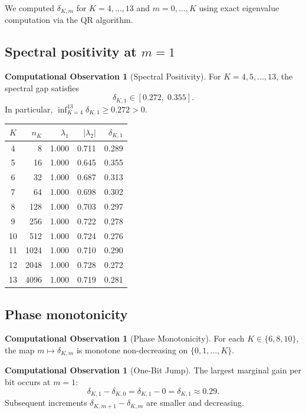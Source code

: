 \documentclass[12pt]{article}
\theoremstyle{definition}
\newtheorem{observation}[theorem]{Computational Observation}
\begin{document}
We computed $\delta_{K,m}$ for $K = 4, \ldots, 13$ and $m = 0, \ldots, K$ using exact eigenvalue computation via the QR algorithm.

\subsection{Spectral positivity at $m=1$}

\begin{observation}[Spectral Positivity]
\label{obs:positivity}
For $K = 4, 5, \ldots, 13$, the spectral gap satisfies
\[
  \delta_{K,1} \in [0.272,\; 0.355].
\]
In particular, $\inf_{K=4}^{13} \delta_{K,1} \geq 0.272 > 0$.
\end{observation}

\begin{center}
\begin{tabular}{@{}crrrr@{}}
\toprule
$K$ & $n_K$ & $\lambda_1$ & $|\lambda_2|$ & $\delta_{K,1}$ \\
\midrule
 4 &    8 & 1.000 & 0.711 & 0.289 \\
 5 &   16 & 1.000 & 0.645 & 0.355 \\
 6 &   32 & 1.000 & 0.687 & 0.313 \\
 7 &   64 & 1.000 & 0.698 & 0.302 \\
 8 &  128 & 1.000 & 0.703 & 0.297 \\
 9 &  256 & 1.000 & 0.722 & 0.278 \\
10 &  512 & 1.000 & 0.724 & 0.276 \\
11 & 1024 & 1.000 & 0.710 & 0.290 \\
12 & 2048 & 1.000 & 0.728 & 0.272 \\
13 & 4096 & 1.000 & 0.719 & 0.281 \\
\bottomrule
\end{tabular}
\end{center}

\subsection{Phase monotonicity}

\begin{observation}[Phase Monotonicity]
\label{obs:mono}
For each $K \in \{6, 8, 10\}$, the map $m \mapsto \delta_{K,m}$ is monotone non-decreasing on $\{0, 1, \ldots, K\}$.
\end{observation}

\begin{observation}[One-Bit Jump]
\label{obs:jump}
The largest marginal gain per bit occurs at $m = 1$:
\[
  \delta_{K,1} - \delta_{K,0} = \delta_{K,1} - 0 = \delta_{K,1} \approx 0.29.
\]
Subsequent increments $\delta_{K,m+1} - \delta_{K,m}$ are smaller and decreasing.
\end{observation}
\end{document}
